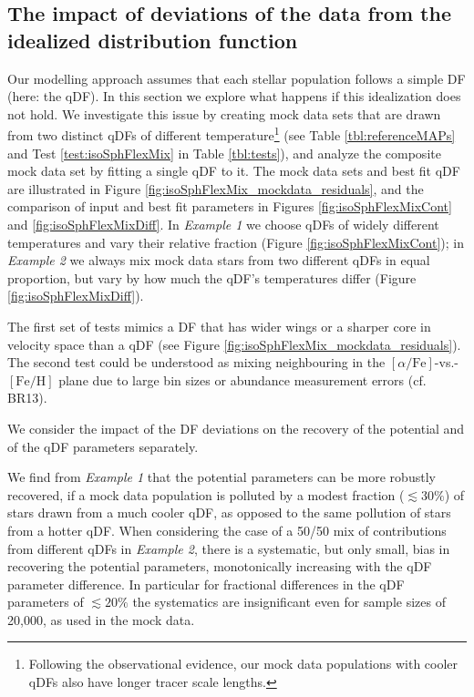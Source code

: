 
\subsection{The impact of deviations of the data from the idealized distribution function} \label{sec:results_mixedDFs}

Our modelling approach assumes that each stellar population follows a simple DF (here: the qDF). In this section we explore what happens if this idealization does not hold. We investigate this issue by creating mock data sets that are drawn from two distinct qDFs of different temperature\footnote{Following the observational evidence, our mock data populations with cooler qDFs also have longer tracer scale lengths.} (see Table \ref{tbl:referenceMAPs} and Test \ref{test:isoSphFlexMix} in Table \ref{tbl:tests}), and analyze the composite mock data set by fitting a single qDF to it. The mock data sets and best fit qDF are illustrated in Figure \ref{fig:isoSphFlexMix_mockdata_residuals}, and the comparison of input and best fit parameters in Figures \ref{fig:isoSphFlexMixCont} and \ref{fig:isoSphFlexMixDiff}. In \emph{Example 1} we choose qDFs of widely different temperatures and vary their relative fraction (Figure \ref{fig:isoSphFlexMixCont}); in \emph{Example 2} we always mix mock data stars from two different qDFs in equal proportion, but vary by how much the qDF's temperatures differ (Figure \ref{fig:isoSphFlexMixDiff}). 

The first set of tests mimics a DF that has wider wings or a sharper core in velocity space than a qDF (see Figure \ref{fig:isoSphFlexMix_mockdata_residuals}). The second test could be understood as mixing neighbouring \MAPs{} in the $[\alpha/\mathrm{Fe}]$-vs.-$[\mathrm{Fe}/\mathrm{H}]$ plane due to large bin sizes or abundance measurement errors (cf. BR13). 


We consider the impact of the DF deviations on the recovery of the potential and of the qDF parameters separately. 

We find from \emph{Example 1} that the potential parameters can be more robustly recovered, if a mock data population is polluted by a modest fraction ($\lesssim 30\%$) of stars drawn from a much cooler qDF, as opposed to the same pollution of stars from a hotter qDF. When considering the case of a 50/50 mix of contributions from different qDFs in \emph{Example 2}, there is a systematic, but only small, bias in recovering the potential parameters, monotonically increasing with the qDF parameter difference. In particular for fractional differences in the qDF parameters of $\lesssim 20\%$ the systematics are insignificant even for sample sizes of 20,000, as used in the mock data.


